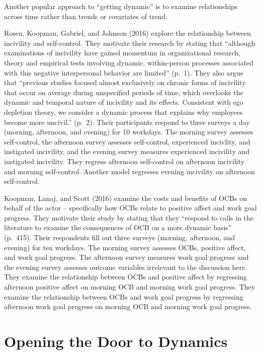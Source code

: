 \documentclass[english,,man]{apa6}
\begin{document}
Another popular approach to \enquote{getting dynamic} is to examine relationships across time rather than trends or covariates of trend.

Rosen, Koopman, Gabriel, and Johnson (2016) explore the relationship between incivility and self-control. They motivate their research by stating that \enquote{although examinations of incivility have gained momentum in organizational research, theory and empirical tests involving dynamic, within-person processes associated with this negative interpersonal behavior are limited} (p.~1). They also argue that \enquote{previous studies focused almost exclusively on chronic forms of incivility that occur on average during unspecified periods of time, which overlooks the dynamic and temporal nature of incivility and its effects. Consistent with ego depletion theory, we consider a dynamic process that explains why employees become more uncivil.} (p.~2). Their participants respond to three surveys a day (morning, afternoon, and evening) for 10 workdays. The morning survey assesses self-control, the afternoon survey assesses self-control, experienced incivlity, and instigated incivility, and the evening survey measures experienced incivility and instigated incivility. They regress afternoon self-control on afternoon incivility and morning self-control. Another model regresses evening incivility on afternoon self-control.

Koopman, Lanaj, and Scott (2016) examine the costs and benefits of OCBs on behalf of the actor -- specifically how OCBs relate to positive affect and work goal progress. They motivate their study by stating that they \enquote{respond to calls in the literature to examine the consequences of OCB on a more dynamic basis} (p.~415). Their respondents fill out three surveys (morning, afternoon, and evening) for ten workdays. The morning survey assesses OCBs, positive affect, and work goal progress. The afternoon survey measures work goal progress and the evening survey assesses outcome variables irrelevant to the discussion here. They examine the relationship between OCBs and positive affect by regressing afternoon positive affect on morning OCB and morning work goal progress. They examine the relationship between OCBs and work goal progress by regressing afternoon work goal progress on morning OCB and morning work goal progress.

\hypertarget{opening-the-door-to-dynamics}{%
\section{Opening the Door to Dynamics}\label{opening-the-door-to-dynamics}}
\end{document}
